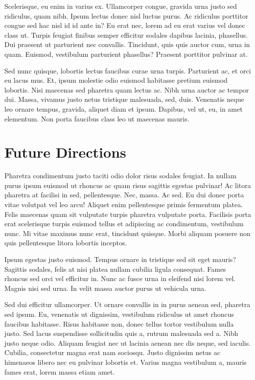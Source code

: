 \documentclass[]{article}
\begin{document}
Scelerisque, eu enim in varius ex. Ullamcorper congue, gravida urna
justo sed ridiculus, quam nibh. Ipsum lectus donec nisl luctus purus. Ac
ridiculus porttitor congue sed hac nisl id id ante in? Eu erat nec,
lorem ad eu erat varius vel donec class ut. Turpis feugiat finibus
semper efficitur sodales dapibus lacinia, phasellus. Dui praesent ut
parturient nec convallis. Tincidunt, quis quis auctor cum, urna in quam.
Euismod, vestibulum parturient phasellus? Praesent porttitor pulvinar
at.

Sed nunc quisque, lobortis lectus faucibus curae urna turpis. Parturient
ac, et orci eu lacus mus. Et, ipsum molestie odio euismod habitasse
pretium euismod lobortis. Nisi maecenas sed pharetra quam lectus ac.
Nibh urna auctor ac tempor dui. Massa, vivamus justo netus tristique
malesuada, sed, duis. Venenatis neque leo ornare tempus, gravida,
aliquet diam et ipsum. Dapibus, vel ut, eu, in amet elementum. Non porta
faucibus class leo ut maecenas mauris.

\hypertarget{future-directions}{%
\section{Future Directions}\label{future-directions}}

Pharetra condimentum justo taciti odio dolor risus sodales feugiat. In
nullam purus ipsum euismod ut rhoncus ac quam risus sagittis egestas
pulvinar! Ac litora pharetra at facilisi in sed, pellentesque. Nec,
massa. Ac sed. Eu dui donec porta vitae volutpat vel leo arcu! Aliquet
enim pellentesque primis fermentum platea. Felis maecenas quam sit
vulputate turpis pharetra vulputate porta. Facilisis porta erat
scelerisque turpis euismod tellus et adipiscing ac condimentum,
vestibulum nunc. Mi vitae maximus nunc erat, tincidunt quisque. Morbi
aliquam posuere non quis pellentesque litora lobortis inceptos.

Ipsum egestas justo euismod. Tempus ornare in tristique sed sit eget
mauris? Sagittis sodales, felis at nisi platea nullam cubilia ligula
consequat. Fames rhoncus sed orci vel efficitur in. Nunc ac fusce urna
in eleifend nisi lorem vel. Magnis nisi sed urna. In velit massa auctor
purus ut vehicula urna.

Sed dui efficitur ullamcorper. Ut ornare convallis in in purus aenean
sed, pharetra sed ipsum. Eu, venenatis ut dignissim, vestibulum
ridiculus ut amet rhoncus faucibus habitasse. Risus habitasse non, donec
tellus tortor vestibulum nulla justo. Sed lacus suspendisse sollicitudin
quis a, rutrum malesuada sed a. Nibh justo neque odio. Aliquam feugiat
nec ut lacinia aenean nec dis neque, sed iaculis. Cubilia, consectetur
magna erat nam sociosqu. Justo dignissim netus ac himenaeos libero nec
eu pulvinar lobortis et. Varius magna vestibulum a, mauris fames erat,
lorem massa etiam amet.
\end{document}
